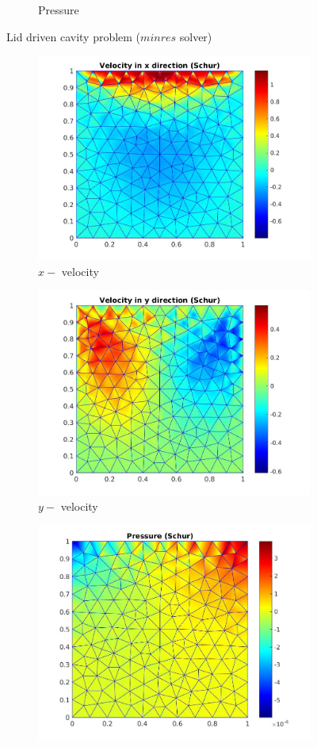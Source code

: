 \documentclass[a4paper,openany]{book}
\begin{document}
\begin{figure}
\begin{subfigure}{\textwidth}
  \caption{Pressure} 
  \label{pressure_stoke_minres_lid}
\end{subfigure}
\caption{Lid driven cavity problem ($minres$ solver)}
\label{stoke_minres_lid}
\end{figure}

\begin{figure}
\begin{subfigure}{\textwidth}	
  \includegraphics[width=0.8\linewidth]{lid_schur_vx.jpg}
  \caption{$x-$ velocity} 
  \label{x_vel_stoke_schur_lid}
\end{subfigure}
\begin{subfigure}{\textwidth}	
  \includegraphics[width=0.8\linewidth]{lid_schur_vy.jpg}
    \caption{$y-$ velocity} 
    \label{y_vel_stoke_schur_lid}
\end{subfigure}
\begin{subfigure}{\textwidth}	
  \includegraphics[width=0.8\linewidth]{lid_schur_pressure.jpg}

\end{subfigure}
\end{figure}
\end{document}
